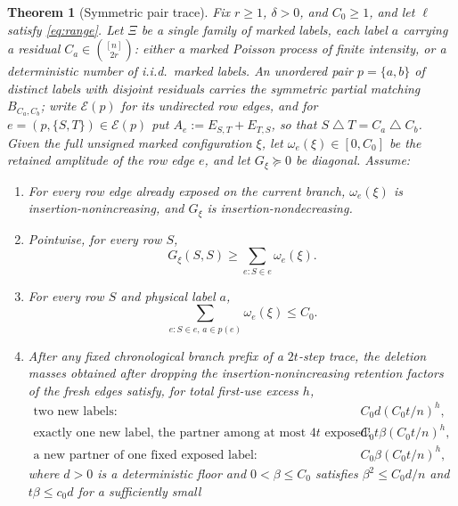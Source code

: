 \documentclass[11pt]{article}
\newtheorem{theorem}{Theorem}[section]
\theoremstyle{definition}
\theoremstyle{remark}
\newcommand{\1}{\mathbf 1}
\newcommand{\sd}{\mathbin{\triangle}}
\numberwithin{equation}{section}
\begin{document}
\begin{theorem}[Symmetric pair trace]\label{thm:packet-trace}
Fix $r\ge1$, $\delta>0$, and $C_0\ge1$, and let $\ell$ satisfy
\cref{eq:range}.  Let $\Xi$ be a single family of marked labels, each
label $a$ carrying a residual $C_a\in\binom{[n]}{2r}$: either a marked
Poisson process of finite intensity, or a deterministic number of
i.i.d.\ marked labels.  An unordered pair $p=\{a,b\}$ of distinct labels
with disjoint residuals carries the symmetric partial matching
$B_{C_a,C_b}$; write $\mathcal E(p)$ for its undirected row edges, and
for $e=(p,\{S,T\})\in\mathcal E(p)$ put $A_e:=E_{S,T}+E_{T,S}$, so that
$S\sd T=C_a\sd C_b$.  Given the full unsigned marked configuration
$\xi$, let $\omega_e(\xi)\in[0,C_0]$ be the retained amplitude of the
row edge $e$, and let $G_\xi\succeq0$ be diagonal.  Assume:
\begin{enumerate}[label=\textup{(P\arabic*)}]
\item\label{P-monotone} For every row edge already exposed on the
current branch, $\omega_e(\xi)$ is insertion-nonincreasing, and $G_\xi$
is insertion-nondecreasing.
\item\label{P-diagonal} Pointwise, for every row $S$,
\begin{equation}\label{eq:packet-diagonal}
 G_\xi(S,S)\ge
 \sum_{e:S\in e}\omega_e(\xi).
\end{equation}
\item\label{P-port} For every row $S$ and physical label $a$,
\begin{equation}\label{eq:packet-port}
 \sum_{e:S\in e,\,a\in p(e)}\omega_e(\xi)\le C_0.
\end{equation}
\item\label{P-mass} After any fixed chronological branch prefix of a
$2t$-step trace, the deletion masses obtained after dropping the
insertion-nonincreasing retention factors of the fresh edges satisfy,
for total first-use excess $h$,
\begin{align}
 \text{two new labels:}&\quad C_0d(C_0t/n)^h,\label{eq:packet-mass-two}\\
 \text{exactly one new label, the partner among at most $4t$ exposed:}
 &\quad C_0t\beta(C_0t/n)^h,\label{eq:packet-mass-one}\\
 \text{a new partner of one fixed exposed label:}
 &\quad C_0\beta(C_0t/n)^h,\label{eq:packet-mass-partner}
\end{align}
where $d>0$ is a deterministic floor and $0<\beta\le C_0$ satisfies
$\beta^2\le C_0d/n$ and $t\beta\le c_0d$ for a sufficiently small

\end{enumerate}
\end{theorem}
\end{document}
